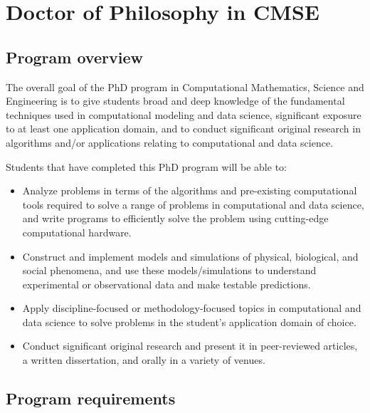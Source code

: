 \section{Doctor of Philosophy in CMSE}
\label{sec:phd}

\subsection{Program overview}
\label{sec:phd_overview}

The overall goal of the PhD program in Computational Mathematics,
Science and Engineering is to give students broad and deep knowledge
of the fundamental techniques used in computational modeling and data
science, significant exposure to at least one application domain, and
to conduct significant original research in algorithms and/or
applications relating to computational and data science.

\vspace{2mm}
\noindent
Students that have completed this PhD program will be able to:

\begin{itemize}
\item  Analyze problems in terms of the algorithms and pre-existing
  computational tools required to solve a range of problems in
  computational and data science, and write programs to efficiently
  solve the problem using cutting-edge computational hardware.  

\item  Construct and implement models and simulations of physical,
  biological, and social phenomena, and use these models/simulations
  to understand experimental or observational data and make testable predictions.  

\item  Apply discipline-focused or methodology-focused topics in
  computational and data science to solve problems in the student's
  application domain of choice.

\item  Conduct significant original research and present it in
  peer-reviewed articles, a written dissertation, and orally in a
  variety of venues.  


\end{itemize}


\subsection{Program requirements}
\label{sec:phd_requirements}


